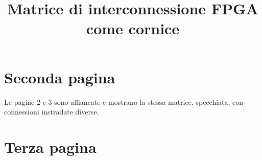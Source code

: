\documentclass[a4paper,11pt,twoside]{article}
\title{Matrice di interconnessione FPGA come cornice}
\author{}
\date{}
\begin{document}
\maketitle
\lipsum[1-6]
\newpage
\section{Seconda pagina}
Le pagine 2 e 3 sono affiancate e mostrano la stessa matrice, specchiata, con connessioni instradate diverse.
\lipsum[7-12]
\newpage
\section{Terza pagina}
\lipsum[13-18]
\end{document}
